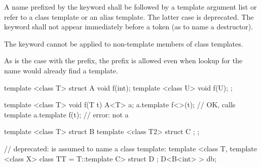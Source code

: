 \pnum
A name prefixed by the keyword
shall be followed by a template argument list or
refer to a class template or an alias template.
The latter case is deprecated.
The keyword  shall not appear immediately
before a \tcode{\~} token (as to name a destructor).
\begin{note}
The keyword
cannot be applied to non-template members of class templates.
\end{note}
\begin{note}
As is the case with the
prefix, the
prefix is allowed
even when lookup for the name would already find a template.
\end{note}
\begin{example}
\begin{codeblock}
template <class T> struct A {
  void f(int);
  template <class U> void f(U);
};

template <class T> void f(T t) {
  A<T> a;
  a.template f<>(t);                    // OK, calls template
  a.template f(t);                      // error: not a 
}

template <class T> struct B {
  template <class T2> struct C { };
};

// deprecated:  is assumed to name a class template:
template <class T, template <class X> class TT = T::template C> struct D { };
D<B<int> > db;
\end{codeblock}
\end{example}

